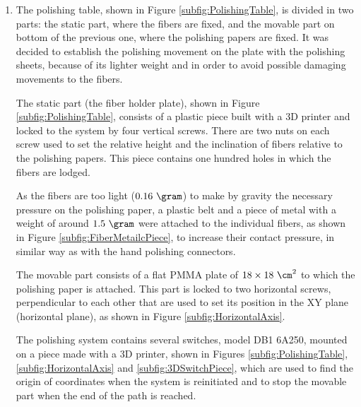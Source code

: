 \begin{enumerate}
\item{} The polishing table, shown in Figure \ref{subfig:PolishingTable}, is divided in two parts: the static part, where the fibers are fixed, and the movable part on bottom of the previous one, where the polishing papers are fixed. It was decided to establish the polishing movement on the plate with the polishing sheets, because of its lighter weight and in order to avoid possible damaging movements to the fibers.

The static part (the fiber holder plate), shown in Figure \ref{subfig:PolishingTable}, consists of a plastic piece built with a 3D printer and locked to the system by four vertical screws. There are two nuts on each screw used to set the relative height and the inclination of fibers relative to the polishing papers. This piece contains one hundred holes in which the fibers are lodged. 

As the fibers are too light ($0.16~\gram$) to make by gravity the necessary pressure on the polishing paper, a plastic belt and a piece of metal with a weight of around $1.5~\gram$ were attached to the individual fibers, as shown in Figure \ref{subfig:FiberMetailcPiece}, to increase their contact pressure, in similar way as with the hand polishing connectors. 

The movable part consists of a flat PMMA plate of $18 \times 18~\cm^2$ to which the polishing paper is attached. This part is locked to two horizontal screws, perpendicular to each other that are used to set its position in the XY plane (horizontal plane), as shown in Figure \ref{subfig:HorizontalAxis}.

The polishing system contains several switches, model DB1 6A250, mounted on a piece made with a 3D printer, shown in Figures \ref{subfig:PolishingTable}, \ref{subfig:HorizontalAxis} and \ref{subfig:3DSwitchPiece}, which are used to find the origin of coordinates when the system is reinitiated and to stop the movable part when the end of the path is reached. 


\end{enumerate}
